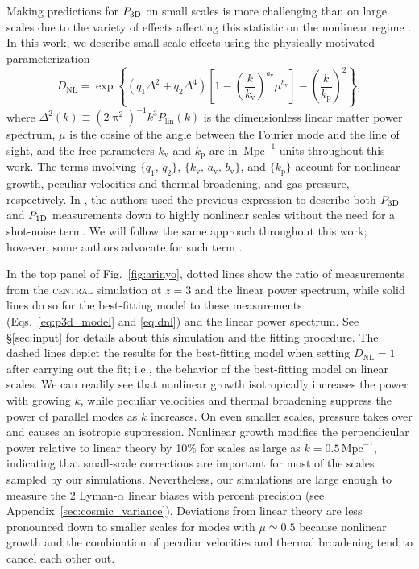 \documentclass{aa}
\newcommand{\lya}{Lyman-$\alpha$\xspace}
\newcommand{\poned}{\ensuremath{P_{\rm 1D}}\xspace}
\newcommand{\pthreed}{\ensuremath{P_{\rm 3D}}\xspace}
\newcommand{\simcentral}{\textsc{central}\xspace}
\newcommand{\iMpc}{\ensuremath{\,\mathrm{Mpc}^{-1}}}
\begin{document}
Making predictions for \pthreed on small scales is more challenging than on large scales due to the variety of effects affecting this statistic on the nonlinear regime \citep[e.g.;][]{mcdonald2003MeasurementCosmologicalGeometry}. In this work, we describe small-scale effects using the physically-motivated \citet{arinyo-i-prats2015NonlinearPowerSpectrum} parameterization
%
\begin{equation}
    \label{eq:dnl}
    D_\mathrm{NL} = \exp \left\{\left(q_1 \Delta^2 + q_2 \Delta^4\right) \left[1-\left(\frac{k}{k_\mathrm{v}}\right)^{a_\mathrm{v}} \mu^{b_\mathrm{v}}\right] - \left(\frac{k}{k_\mathrm{p}}\right)^2 \right\},
\end{equation}
%
where $\Delta^2(k)\equiv(2\uppi^2)^{-1} k^3 P_\mathrm{lin}(k)$ is the dimensionless linear matter power spectrum, $\mu$ is the cosine of the angle between the Fourier mode and the line of sight, and the free parameters $k_\mathrm{v}$ and $k_\mathrm{p}$ are in $\iMpc$ units throughout this work. The terms involving $\{q_1,\,q_2\}$, $\{k_\mathrm{v},\, a_\mathrm{v},\, b_\mathrm{v}\}$, and $\{k_\mathrm{p}\}$ account for nonlinear growth, peculiar velocities and thermal broadening, and gas pressure, respectively. In \citep{givans2022NonlinearitiesLymanAlpha}, the authors used the previous expression to describe both \pthreed and \poned measurements down to highly nonlinear scales without the need for a shot-noise term. We will follow the same approach throughout this work; however, some authors advocate for such term \citep[e.g.;][]{irsicmcquinn2018}.

In the top panel of Fig.~\ref{fig:arinyo}, dotted lines show the ratio of measurements from the \simcentral simulation at $z=3$ and the linear power spectrum, while solid lines do so for the best-fitting model to these measurements (Eqs.~\ref{eq:p3d_model} and \ref{eq:dnl}) and the linear power spectrum. See \S\ref{sec:input} for details about this simulation and the fitting procedure. The dashed lines depict the results for the best-fitting model when setting $D_\mathrm{NL}=1$ after carrying out the fit; i.e., the behavior of the best-fitting model on linear scales. We can readily see that nonlinear growth isotropically increases the power with growing $k$, while peculiar velocities and thermal broadening suppress the power of parallel modes as $k$ increases. On even smaller scales, pressure takes over and causes an isotropic suppression. Nonlinear growth modifies the perpendicular power relative to linear theory by 10\% for scales as large as $k=0.5\iMpc$, indicating that small-scale corrections are important for most of the scales sampled by our simulations. Nevertheless, our simulations are large enough to measure the 2 \lya linear biases with percent precision (see Appendix~\ref{sec:cosmic_variance}). Deviations from linear theory are less pronounced down to smaller scales for modes with $\mu\simeq0.5$ because nonlinear growth and the combination of peculiar velocities and thermal broadening tend to cancel each other out.
\end{document}

